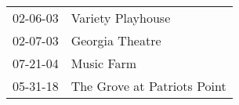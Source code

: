 \begin{supertabular}{p{0.25\columnwidth}p{0.75\columnwidth}}
 02-06-03 &            Variety Playhouse \\
 02-07-03 &              Georgia Theatre \\
 07-21-04 &                   Music Farm \\
 05-31-18 &  The Grove at Patriots Point \\
\end{supertabular}
